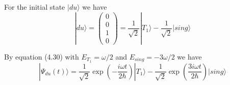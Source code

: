 For the initial state $|du\rangle$ we have
\begin{equation*}
|du\rangle=\begin{pmatrix}0\\0\\1\\0\end{pmatrix}
=\frac{1}{\sqrt2}|T_1\rangle-\frac{1}{\sqrt2}|sing\rangle
\end{equation*}

By equation (4.30) with $E_{T_1}=\omega/2$ and $E_{sing}=-3\omega/2$ we have
\begin{equation*}
|\Psi_{du}(t)\rangle
=\frac{1}{\sqrt2}\exp\left(-\frac{i\omega t}{2\hbar}\right)|T_1\rangle
-\frac{1}{\sqrt2}\exp\left(\frac{3i\omega t}{2\hbar}\right)|sing\rangle
\end{equation*}


